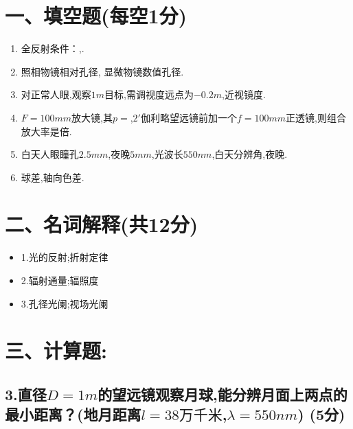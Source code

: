 \documentclass[11pt,a4paper]{article}
\begin{document}
    \section*{一、填空题(每空1分)}
    \begin{enumerate}
        \vspace{0mm}
        \item 全反射条件：\underline{\makebox[2cm]{}},\underline{\makebox[2cm]{}}.
        \vspace{-3mm}
        \item 照相物镜相对孔径\underline{\makebox[2cm]{}}, 显微物镜数值孔径\underline{\makebox[2cm]{}}.
        \vspace{-3mm}
        \item 对正常人眼,观察$1m$目标,需调\underline{\makebox[2cm]{}}视度远点为$-0.2m$,近视镜\underline{\makebox[2cm]{}}度.
        \vspace{-3mm}
        \item $F=100mm$放大镜,其$p=$\underline{\makebox[2cm]{}},$2'$伽利略望远镜前加一个$f=100mm$正透镜,则组合放大率是\underline{\makebox[2cm]{}}倍.
        \vspace{-3mm}
        \item 白天人眼瞳孔$2.5mm$,夜晚$5mm$,光波长$550nm$,白天分辨角\underline{\makebox[2cm]{}},夜晚\underline{\makebox[2cm]{}}.
        \vspace{-3mm}
        \item 球差\underline{\makebox[4cm]{}},轴向色差\underline{\makebox[4cm]{}}.
        \vspace{-3mm}
    \end{enumerate}
    \section*{二、名词解释(共12分)}
    \begin{itemize}
        \item 1.光的反射;折射定律
        \vspace{10mm}
        \item 2.辐射通量;辐照度
        \vspace{10mm}
        \item 3.孔径光阑;视场光阑
        \vspace{10mm}
    \end{itemize}
    \section*{三、计算题:}
    \subsection*{3.直径$D=1m$的望远镜观察月球,能分辨月面上两点的最小距离？(地月距离$l=38\text{万千米}$,$\lambda =550nm$) (5分)}
    \vspace{10mm}
\end{document}
